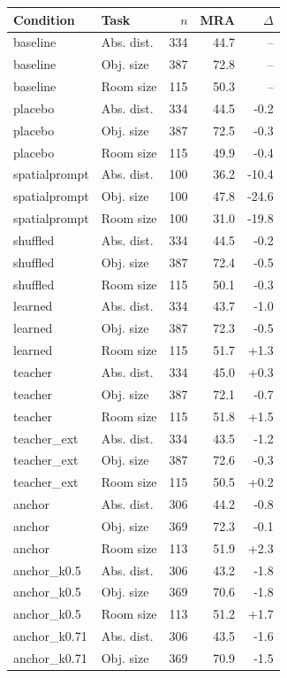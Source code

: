 \begin{tabular}{llrrr}
\toprule
Condition & Task & $n$ & MRA & $\Delta$ \\
\midrule
baseline & Abs. dist. & 334 & 44.7 & -- \\
baseline & Obj. size & 387 & 72.8 & -- \\
baseline & Room size & 115 & 50.3 & -- \\
placebo & Abs. dist. & 334 & 44.5 & -0.2 \\
placebo & Obj. size & 387 & 72.5 & -0.3 \\
placebo & Room size & 115 & 49.9 & -0.4 \\
spatialprompt & Abs. dist. & 100 & 36.2 & -10.4 \\
spatialprompt & Obj. size & 100 & 47.8 & -24.6 \\
spatialprompt & Room size & 100 & 31.0 & -19.8 \\
shuffled & Abs. dist. & 334 & 44.5 & -0.2 \\
shuffled & Obj. size & 387 & 72.4 & -0.5 \\
shuffled & Room size & 115 & 50.1 & -0.3 \\
learned & Abs. dist. & 334 & 43.7 & -1.0 \\
learned & Obj. size & 387 & 72.3 & -0.5 \\
learned & Room size & 115 & 51.7 & +1.3 \\
teacher & Abs. dist. & 334 & 45.0 & +0.3 \\
teacher & Obj. size & 387 & 72.1 & -0.7 \\
teacher & Room size & 115 & 51.8 & +1.5 \\
teacher\_ext & Abs. dist. & 334 & 43.5 & -1.2 \\
teacher\_ext & Obj. size & 387 & 72.6 & -0.3 \\
teacher\_ext & Room size & 115 & 50.5 & +0.2 \\
anchor & Abs. dist. & 306 & 44.2 & -0.8 \\
anchor & Obj. size & 369 & 72.3 & -0.1 \\
anchor & Room size & 113 & 51.9 & +2.3 \\
anchor\_k0.5 & Abs. dist. & 306 & 43.2 & -1.8 \\
anchor\_k0.5 & Obj. size & 369 & 70.6 & -1.8 \\
anchor\_k0.5 & Room size & 113 & 51.2 & +1.7 \\
anchor\_k0.71 & Abs. dist. & 306 & 43.5 & -1.6 \\
anchor\_k0.71 & Obj. size & 369 & 70.9 & -1.5 \\

\end{tabular}
